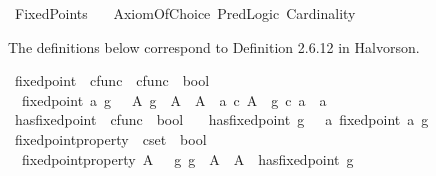 %
\begin{isabellebody}%
%
%
\isadelimtheory
%
\endisadelimtheory
%
\isatagtheory
{}\isamarkupfalse%
\ Fixed{\isacharunderscore}{\kern0pt}Points\isanewline
\ \ \ Axiom{\isacharunderscore}{\kern0pt}Of{\isacharunderscore}{\kern0pt}Choice\ Pred{\isacharunderscore}{\kern0pt}Logic\ Cardinality\isanewline
{}%
\endisatagtheory
{\isafoldtheory}%
%
\isadelimtheory
%
\endisadelimtheory
%
\begin{isamarkuptext}%
The definitions below correspond to Definition 2.6.12 in Halvorson.%
\end{isamarkuptext}\isamarkuptrue%
\isamarkupfalse%
\ fixed{\isacharunderscore}{\kern0pt}point\ {\isacharcolon}{\kern0pt}{\isacharcolon}{\kern0pt}\ {\isachardoublequoteopen}cfunc\ {\isasymRightarrow}\ cfunc\ {\isasymRightarrow}\ bool{\isachardoublequoteclose}\ \isanewline
\ \ {\isachardoublequoteopen}fixed{\isacharunderscore}{\kern0pt}point\ a\ g\ {\isasymlongleftrightarrow}\ {\isacharparenleft}{\kern0pt}{\isasymexists}\ A{\isachardot}{\kern0pt}\ g\ {\isacharcolon}{\kern0pt}\ A\ {\isasymrightarrow}\ A\ {\isasymand}\ a\ {\isasymin}\isactrlsub c\ A\ {\isasymand}\ g\ {\isasymcirc}\isactrlsub c\ a\ {\isacharequal}{\kern0pt}\ a{\isacharparenright}{\kern0pt}{\isachardoublequoteclose}\isanewline
{}\isamarkupfalse%
\ has{\isacharunderscore}{\kern0pt}fixed{\isacharunderscore}{\kern0pt}point\ {\isacharcolon}{\kern0pt}{\isacharcolon}{\kern0pt}\ {\isachardoublequoteopen}cfunc\ {\isasymRightarrow}\ bool{\isachardoublequoteclose}\ \isanewline
\ \ {\isachardoublequoteopen}has{\isacharunderscore}{\kern0pt}fixed{\isacharunderscore}{\kern0pt}point\ g\ {\isasymlongleftrightarrow}\ {\isacharparenleft}{\kern0pt}{\isasymexists}\ a{\isachardot}{\kern0pt}\ fixed{\isacharunderscore}{\kern0pt}point\ a\ g{\isacharparenright}{\kern0pt}{\isachardoublequoteclose}\isanewline
{}\isamarkupfalse%
\ fixed{\isacharunderscore}{\kern0pt}point{\isacharunderscore}{\kern0pt}property\ {\isacharcolon}{\kern0pt}{\isacharcolon}{\kern0pt}\ {\isachardoublequoteopen}cset\ {\isasymRightarrow}\ bool{\isachardoublequoteclose}\ \isanewline
\ \ {\isachardoublequoteopen}fixed{\isacharunderscore}{\kern0pt}point{\isacharunderscore}{\kern0pt}property\ A\ {\isasymlongleftrightarrow}\ {\isacharparenleft}{\kern0pt}{\isasymforall}\ g{\isachardot}{\kern0pt}\ g\ {\isacharcolon}{\kern0pt}\ A\ {\isasymrightarrow}\ A\ {\isasymlongrightarrow}\ has{\isacharunderscore}{\kern0pt}fixed{\isacharunderscore}{\kern0pt}point\ g{\isacharparenright}{\kern0pt}{\isachardoublequoteclose}\isanewline

\end{isabellebody}
